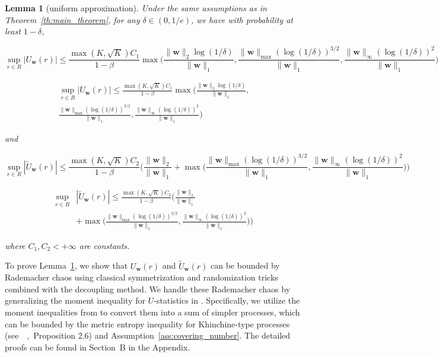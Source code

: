 \documentclass[letterpaper]{article} %
\def\DoubleColumn{}
\def\DoubleColumnEnd{}
\def\SingleColumn{}
\def\SingleColumnEnd{}
\newtheorem{lemma}{Lemma}
\newcommand{\weight}{\mathbf{w}}
\newcommand{\normo}[1]{\|#1\|_1}
\newcommand{\complexbound}{\beta}
\newcommand{\citep}[3]{(#1\ \citeauthor{#3}\ \citeyear{#3},\ #2)}
\begin{document}
\begin{lemma}[uniform approximation]
    \label{le:uniform_approximation}
    Under the same assumptions as in Theorem~\ref{th:main_theorem}, for any $\delta\in (0,1/e)$, we have with probability at least $1-\delta$,
    \SingleColumn
    \[\sup_{r\in R}|U_\weight{}(r)|\le \frac{\max(K,\sqrt{K})C_1}{1-\complexbound{}}\max\Big(\frac{\|\weight{}\|_2\log(1/\delta)}{\normo{\weight{}}},\frac{\|\weight{}\|_{\max}(\log(1/\delta))^{3/2}}{\normo{\weight{}}}, \frac{\|\weight{}\|_\infty(\log(1/\delta))^2}{\normo{\weight{}}}\Big)\]
    \SingleColumnEnd
    \DoubleColumn
    \begin{align*}
        \sup_{r\in R}|U_\weight{}(r)|\le \frac{\max(K,\sqrt{K})C_1}{1-\complexbound{}}\max\Big(\frac{\|\weight{}\|_2\log(1/\delta)}{\normo{\weight{}}},\\
        \frac{\|\weight{}\|_{\max}(\log(1/\delta))^{3/2}}{\normo{\weight{}}}, \frac{\|\weight{}\|_\infty(\log(1/\delta))^2}{\normo{\weight{}}}\Big)
    \end{align*}
    \DoubleColumnEnd
    and
    \SingleColumn
    \[\sup_{r\in R}|\widetilde{U}_\weight{}(r)|\le \frac{\max(K,\sqrt{K})C_2}{1-\complexbound{}}\Bigg(\frac{\|\weight{}\|_2}{\normo{\weight{}}}+\max\Big(\frac{\|\weight{}\|_{\max}(\log(1/\delta))^{3/2}}{\normo{\weight{}}},\frac{\|\weight{}\|_\infty(\log(1/\delta))^2}{\normo{\weight{}}}\Big)\Bigg)\]
    \SingleColumnEnd
    \DoubleColumn
    \begin{align*}
        \sup_{r\in R}&|\widetilde{U}_\weight{}(r)|\le \frac{\max(K,\sqrt{K})C_2}{1-\complexbound{}}\Bigg(\frac{\|\weight{}\|_2}{\normo{\weight{}}}\\
        &+\max\Big(\frac{\|\weight{}\|_{\max}(\log(1/\delta))^{3/2}}{\normo{\weight{}}},\frac{\|\weight{}\|_\infty(\log(1/\delta))^2}{\normo{\weight{}}}\Big)\Bigg)
    \end{align*}
    \DoubleColumnEnd
    where $C_1,C_2 < +\infty$ are constants.
\end{lemma}

To prove Lemma~\ref{le:uniform_approximation}, we show that $U_\weight{}(r)$ and $\widetilde{U}_\weight{}(r)$ can be bounded by Rademacher chaos using classical symmetrization and randomization tricks combined with the decoupling method. We handle these Rademacher chaos by generalizing the moment inequality for $U$-statistics in \cite{clemenccon2008ranking}. 
Specifically, we utilize the moment inequalities from \cite{Boucheron2005} to convert them into a sum of simpler processes, which can be bounded by the metric entropy inequality for Khinchine-type processes \citep{see}{Proposition 2.6}{Dembo1994} and Assumption~\ref{ass:covering_number}. The detailed proofs can be found in Section~B in the Appendix.
\end{document}
